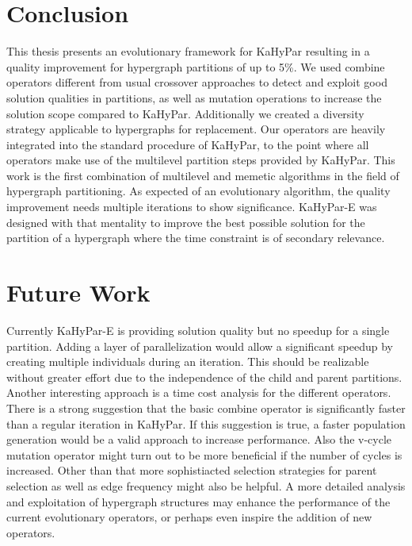 \documentclass[a4paper,12pt,titlepage, BCOR7mm,headsepline]{scrbook}
\numberwithin{equation}{section}
\begin{document}
\section{Conclusion}
This thesis presents an evolutionary framework for KaHyPar resulting in a quality improvement for hypergraph partitions of up to 5\%. We used combine operators different from usual crossover approaches to detect and exploit good solution qualities in partitions, as well as mutation operations to increase the solution scope compared to KaHyPar. Additionally we created a diversity strategy applicable to hypergraphs for replacement. Our operators are heavily integrated into the standard procedure of KaHyPar, to the point where all operators make use of the multilevel partition steps provided by KaHyPar. This work is the first combination of multilevel and memetic algorithms in the field of hypergraph partitioning.
As expected of an evolutionary algorithm, the quality improvement needs multiple iterations to show significance. KaHyPar-E was designed with that mentality to improve the best possible solution for the partition of a hypergraph where the time constraint is of secondary relevance. 
\section{Future Work}
Currently KaHyPar-E is providing solution quality but no speedup for a single partition. Adding a layer of parallelization would allow a significant speedup by creating multiple individuals during an iteration. This should be realizable without greater effort due to the independence of the child and parent partitions. Another interesting approach is a time cost analysis for the different operators. There is a strong suggestion that the basic combine operator is significantly faster than a regular iteration in KaHyPar. If this suggestion is true, a faster population generation would be a valid approach to increase performance. Also the v-cycle mutation operator might turn out to be more beneficial if the number of cycles is increased. Other than that more sophistiacted selection strategies for parent selection as well as edge frequency might also be helpful. A more detailed analysis and exploitation of hypergraph structures may enhance the performance of the current evolutionary operators, or perhaps even inspire the addition of new operators.
\end{document}
